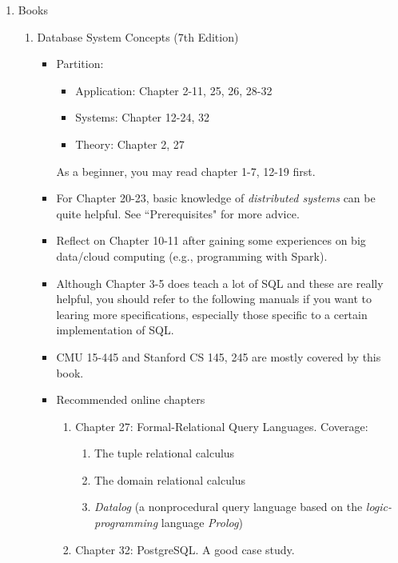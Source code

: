 \documentclass{article}
\begin{document}
\begin{enumerate}
    \item Books
    \begin{enumerate}
    \item Database System Concepts (7th Edition) \cite{silberschatz2002database}
    \begin{itemize}
        \item Partition:
        \begin{itemize}
            \item Application: Chapter 2-11, 25, 26, 28-32
            \item Systems: Chapter 12-24, 32
            \item Theory: Chapter 2, 27
        \end{itemize}
        As a beginner, you may read chapter 1-7, 12-19 first.        
        \item For Chapter 20-23, basic knowledge of \emph{distributed systems} can be quite helpful.
        See ``Prerequisites" for more advice.
        \item Reflect on Chapter 10-11 after gaining some experiences on big data/cloud computing (e.g., programming with Spark).
        \item Although Chapter 3-5 does teach a lot of SQL and these are really helpful, you should refer to the following manuals if you want to learing more specifications, especially those specific to a certain implementation of SQL.
        \item CMU 15-445 and Stanford CS 145, 245 are mostly covered by this book.
        \item Recommended online chapters
        \begin{enumerate}
            \item Chapter 27: Formal-Relational Query Languages.
            Coverage:
            \begin{enumerate}
                \item The tuple relational calculus
                \item The domain relational calculus
                \item \emph{Datalog} (a nonprocedural query language based on the \emph{logic-programming} language \emph{Prolog})
            \end{enumerate}
            \item Chapter 32: PostgreSQL.
            A good case study.
        \end{enumerate}
    \end{itemize}

\end{enumerate}
\end{enumerate}
\end{document}
